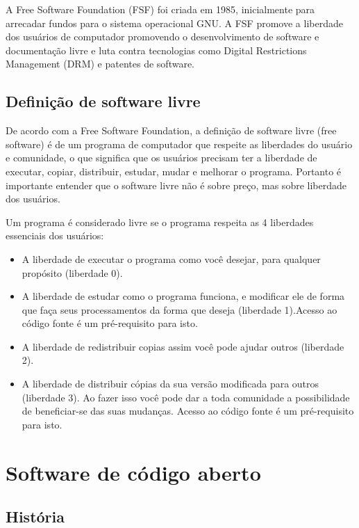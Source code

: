 \documentclass[12pt, a4paper]{report}
\begin{document}
A Free Software Foundation (FSF) foi criada em 1985, inicialmente para arrecadar fundos para o sistema operacional GNU. A FSF promove a liberdade dos usuários de computador promovendo o desenvolvimento de software e documentação livre e luta contra tecnologias como Digital Restrictions Management (DRM) e patentes de software.

\section{Definição de software livre}

De acordo com a Free Software Foundation, a definição de software livre (free software) é de um programa de computador que respeite as liberdades do usuário e comunidade, o que significa que os usuários precisam ter a liberdade de executar, copiar, distribuir, estudar, mudar e melhorar o programa. Portanto é importante entender que o software livre não é sobre preço, mas sobre liberdade dos usuários.

Um programa é considerado livre se o programa respeita as 4 liberdades essenciais dos usuários:

\begin{itemize}

  \item{A liberdade de executar o programa como você desejar, para qualquer propósito (liberdade 0).}
  \item{A liberdade de estudar como o programa funciona, e modificar ele de forma que faça seus processamentos da forma que deseja (liberdade 1).Acesso ao código fonte é um pré-requisito para isto.}
  \item{A liberdade de redistribuir copias assim você pode ajudar outros (liberdade 2).}
  \item{A liberdade de distribuir cópias da sua versão modificada para outros (liberdade 3). Ao fazer isso você pode dar a toda comunidade a possibilidade de beneficiar-se das suas mudanças. Acesso ao código fonte é um pré-requisito para isto.}

\end{itemize}

\chapter{Software de código aberto}

\section{História}
\end{document}
